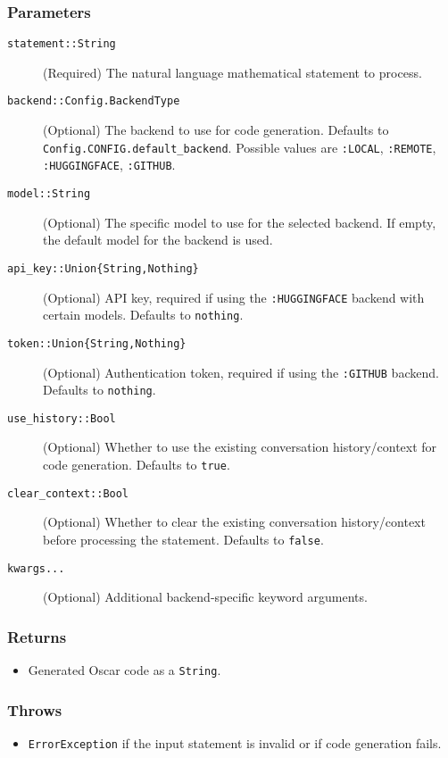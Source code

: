 \documentclass[11pt,a4paper]{article}
\newcommand{\code}[1]{\texttt{#1}}
\providecommand{\code}[1]{\texttt{\color{blue!70!black}#1}}
\begin{document}
\subsubsection*{Parameters}
\begin{description}
    \item[\code{statement::String}] (Required) The natural language mathematical statement to process.
    \item[\code{backend::Config.BackendType}] (Optional) The backend to use for code generation. Defaults to \code{Config.CONFIG.default\_backend}. Possible values are \code{:LOCAL}, \code{:REMOTE}, \code{:HUGGINGFACE}, \code{:GITHUB}.
    \item[\code{model::String}] (Optional) The specific model to use for the selected backend. If empty, the default model for the backend is used.
    \item[\code{api\_key::Union\{String,Nothing\}}] (Optional) API key, required if using the \code{:HUGGINGFACE} backend with certain models. Defaults to \code{nothing}.
    \item[\code{token::Union\{String,Nothing\}}] (Optional) Authentication token, required if using the \code{:GITHUB} backend. Defaults to \code{nothing}.
    \item[\code{use\_history::Bool}] (Optional) Whether to use the existing conversation history/context for code generation. Defaults to \code{true}.
    \item[\code{clear\_context::Bool}] (Optional) Whether to clear the existing conversation history/context before processing the statement. Defaults to \code{false}.
    \item[\code{kwargs...}] (Optional) Additional backend-specific keyword arguments.
\end{description}

\subsubsection*{Returns}
\begin{itemize}
    \item Generated Oscar code as a \code{String}.
\end{itemize}

\subsubsection*{Throws}
\begin{itemize}
    \item \code{ErrorException} if the input statement is invalid or if code generation fails.
\end{itemize}
\end{document}
